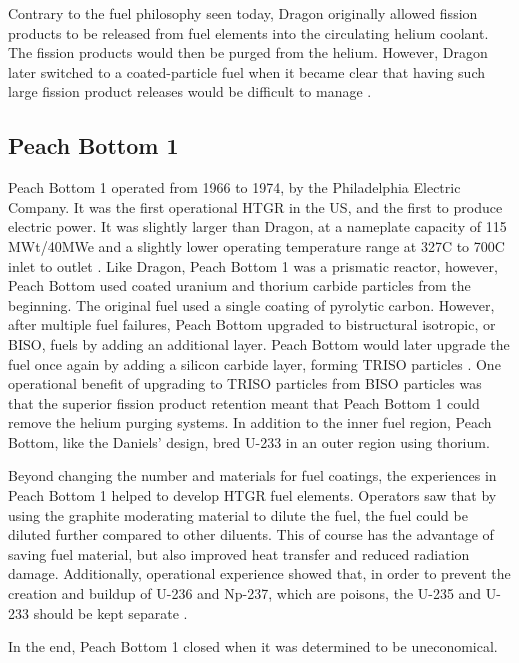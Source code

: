 Contrary to the fuel philosophy seen today, Dragon originally allowed fission products to be released from fuel elements into the circulating helium coolant.  The fission products would then be purged from the helium.  However, Dragon later switched to a coated-particle fuel when it became clear that having such large fission product releases would be difficult to manage \cite{simnad_early_1991}.

\subsection{Peach Bottom 1}

Peach Bottom 1 operated from 1966 to 1974, by the Philadelphia Electric Company.  It was the first operational HTGR in the US, and the first to produce electric power.  It was slightly larger than Dragon, at a nameplate capacity of 115 MWt/40MWe and a slightly lower operating temperature range at 327\textdegree  C to 700\textdegree  C inlet to outlet \cite{beck_high_nodate}.  Like Dragon, Peach Bottom 1 was a prismatic reactor, however, Peach Bottom used coated uranium and thorium carbide particles from the beginning.  The original fuel used a single coating of pyrolytic carbon.  However, after multiple fuel failures, Peach Bottom upgraded to bistructural isotropic, or BISO, fuels by adding an additional layer.  Peach Bottom would later upgrade the fuel once again by adding a silicon carbide layer, forming TRISO particles \cite{beck_high_nodate}.  One operational benefit of upgrading to TRISO particles from BISO particles was that the superior fission product retention meant that Peach Bottom 1 could remove the helium purging systems.  In addition to the inner fuel region, Peach Bottom, like the Daniels' design, bred U-233 in an outer region using thorium.

Beyond changing the number and materials for fuel coatings, the experiences in Peach Bottom 1 helped to develop HTGR fuel elements.  Operators saw that by using the graphite moderating material to dilute the fuel, the fuel could be diluted further compared to other diluents.  This of course has the advantage of saving fuel material, but also improved heat transfer and reduced radiation damage.  Additionally, operational experience showed that, in order to prevent the creation and buildup of U-236 and Np-237, which are poisons, the U-235 and U-233 should be kept separate \cite{simnad_early_1991}.

In the end, Peach Bottom 1 closed when it was determined to be uneconomical.

